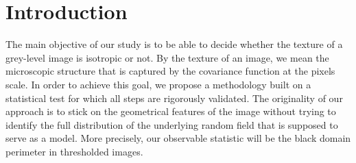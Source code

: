 \documentclass[12pt]{article}
\theoremstyle{Theorem}
\theoremstyle{definition}
\begin{document}
\section{Introduction}



The main objective of our study is to be able to decide whether the texture of a grey-level image is isotropic or not. By the texture of an image, we mean the microscopic structure that is captured by the covariance function at the pixels scale. In order to achieve this goal, we propose a methodology built on a statistical test for which all steps are rigorously validated. The originality of our approach is to stick on the geometrical features of the image without trying to identify the full distribution of the underlying random field that is supposed to serve as a model. More precisely, our observable statistic will be the black domain perimeter in thresholded images.
\end{document}
